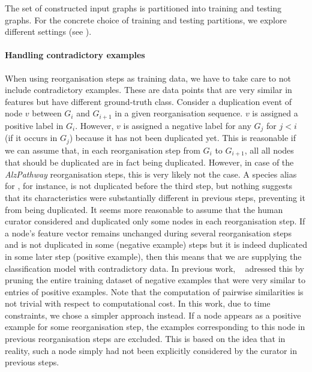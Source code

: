 \documentclass[
	fontsize=10pt, %
	twoside=true, %
	secnumdepth=1, %
  toc=indentunnumbered %
]{kaobook}
\begin{document}
The set of constructed input graphs is partitioned into training and
testing graphs. For the concrete choice of training and testing partitions, we
explore different settings (see ).

\paragraph{Handling contradictory examples} When using reorganisation steps as
training data, we have to take care to not include contradictory examples. These
are data points that are very similar in features but have different
ground-truth class. Consider a duplication event of node $v$ between $G_i$ and
$G_{i+1}$ in a given reorganisation sequence. $v$ is assigned a positive label
in $G_i$. However, $v$ is assigned a negative label for any $G_j$ for $j<i$ (if
it occurs in $G_j$) because it has not been duplicated yet.
This is reasonable if we can assume that, in each
reorganisation step from $G_i$ to $G_{i+1}$, all 
all nodes that should be duplicated
are in fact being duplicated.
%
However, in case of the \textit{AlzPathway} reorganisation steps, this is very
likely not the case. A species alias for , for instance, is not duplicated
before the third step, but nothing suggests that its characteristics were substantially
different in previous steps, preventing it from being duplicated. It seems more
reasonable to assume that the human curator considered and duplicated only some
nodes in each reorganisation step.
%
If a node's feature vector remains unchanged during several reorganisation steps
and is not duplicated in some (negative example) steps but it is indeed
duplicated in some later step (positive example), then this means that we are
supplying the classification model with contradictory data. In previous work,
\nielsen{}~\cite{nielsen_MachineLearningSupport_2019}
adressed this by pruning the entire training dataset of negative
examples that were very similar to entries of positive examples. Note that the
computation of pairwise similarities is not trivial with respect to
computational cost. In this work, due to time constraints, we chose a simpler
approach instead. If a node appears as a positive example for some
reorganisation step, the examples corresponding to this node in previous
reorganisation steps are excluded. This is based on the idea that in reality,
such a node simply had not been explicitly considered by the curator in previous
steps. 
\end{document}

